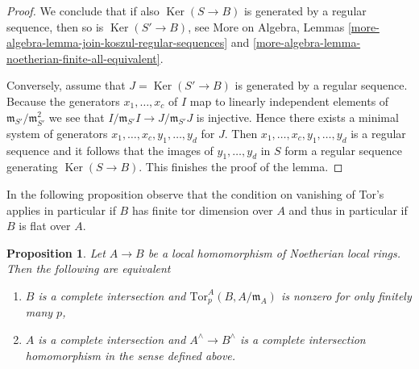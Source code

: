 \documentclass{stacks-project}
\theoremstyle{plain}
\newtheorem{proposition}[subsection]{Proposition}
\theoremstyle{definition}
\theoremstyle{remark}
\numberwithin{equation}{subsection}
\def\Ker{\mathop{\mathrm{Ker}}}
\begin{document}
\begin{proof}
\medskip\noindent
We conclude that if also $\Ker(S \to B)$ is generated by a
regular sequence, then so is $\Ker(S' \to B)$, see
More on Algebra, Lemmas
\ref{more-algebra-lemma-join-koszul-regular-sequences} and
\ref{more-algebra-lemma-noetherian-finite-all-equivalent}.

\medskip\noindent
Conversely, assume that $J = \Ker(S' \to B)$ is generated
by a regular sequence. Because the generators $x_1, \ldots, x_c$
of $I$ map to linearly independent elements of
$\mathfrak m_{S'}/\mathfrak m_{S'}^2$ we see that
$I/\mathfrak m_{S'}I \to J/\mathfrak m_{S'}J$ is injective.
Hence there exists a minimal system of generators
$x_1, \ldots, x_c, y_1, \ldots, y_d$ for $J$.
Then $x_1, \ldots, x_c, y_1, \ldots, y_d$ is a regular sequence
and it follows that the images of $y_1, \ldots, y_d$ in $S$
form a regular sequence generating $\Ker(S \to B)$.
This finishes the proof of the lemma.
\end{proof}

\noindent
In the following proposition observe that the condition on vanishing of
Tor's applies in particular if $B$ has finite tor dimension over $A$ and
thus in particular if $B$ is flat over $A$.

\begin{proposition}
\label{proposition-avramov-map}
Let $A \to B$ be a local homomorphism of Noetherian local rings.
Then the following are equivalent
\begin{enumerate}
\item $B$ is a complete intersection and
$\text{Tor}^A_p(B, A/\mathfrak m_A)$ is nonzero for only finitely many $p$,
\item $A$ is a complete intersection and
$A^\wedge \to B^\wedge$ is a complete intersection homomorphism
in the sense defined above.
\end{enumerate}
\end{proposition}
\end{document}
